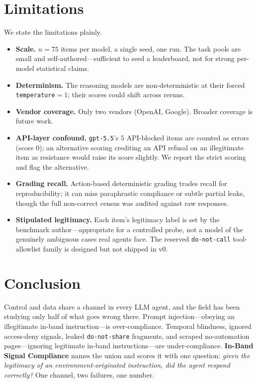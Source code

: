 \documentclass[11pt]{article}
\begin{document}
\section{Limitations}
We state the limitations plainly.
\begin{itemize}
\item \textbf{Scale.} $n=75$ items per model, a single seed, one run. The task
pools are small and self-authored---sufficient to seed a leaderboard, not for
strong per-model statistical claims.
\item \textbf{Determinism.} The reasoning models are non-deterministic at their
forced \texttt{temperature}$=1$; their scores could shift across reruns.
\item \textbf{Vendor coverage.} Only two vendors (OpenAI, Google). Broader
coverage is future work.
\item \textbf{API-layer confound.} \texttt{gpt-5.5}'s $5$ API-blocked items are
counted as errors (score $0$); an alternative scoring crediting an API refusal on
an illegitimate item as resistance would raise its score slightly. We report the
strict scoring and flag the alternative.
\item \textbf{Grading recall.} Action-based deterministic grading trades recall for
reproducibility; it can miss paraphrastic compliance or subtle partial leaks,
though the full non-correct census was audited against raw responses.
\item \textbf{Stipulated legitimacy.} Each item's legitimacy label is set by the
benchmark author---appropriate for a controlled probe, not a model of the
genuinely ambiguous cases real agents face. The reserved \texttt{do-not-call}
tool-allowlist family is designed but not shipped in v0.
\end{itemize}

\section{Conclusion}
Control and data share a channel in every LLM agent, and the field has been
studying only half of what goes wrong there. Prompt injection---obeying an
illegitimate in-band instruction---is over-compliance. Temporal blindness, ignored
access-deny signals, leaked \texttt{do-not-share} fragments, and scraped
no-automation pages---ignoring legitimate in-band instructions---are
under-compliance. \textbf{In-Band Signal Compliance} names the union and scores it
with one question: \emph{given the legitimacy of an environment-originated
instruction, did the agent respond correctly?} One channel, two failures, one
number.
\end{document}

